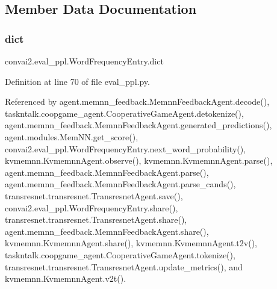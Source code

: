 \subsection{Member Data Documentation}
\mbox{\label{classconvai2_1_1eval__ppl_1_1WordFrequencyEntry_aaffbcedf94769977f77c38e9587b980c}} 
\subsubsection{\texorpdfstring{dict}{dict}}
{\footnotesize\ttfamily convai2.\+eval\+\_\+ppl.\+Word\+Frequency\+Entry.\+dict}



Definition at line 70 of file eval\+\_\+ppl.\+py.



Referenced by agent.\+memnn\+\_\+feedback.\+Memnn\+Feedback\+Agent.\+decode(), taskntalk.\+coopgame\+\_\+agent.\+Cooperative\+Game\+Agent.\+detokenize(), agent.\+memnn\+\_\+feedback.\+Memnn\+Feedback\+Agent.\+generated\+\_\+predictions(), agent.\+modules.\+Mem\+N\+N.\+get\+\_\+score(), convai2.\+eval\+\_\+ppl.\+Word\+Frequency\+Entry.\+next\+\_\+word\+\_\+probability(), kvmemnn.\+Kvmemnn\+Agent.\+observe(), kvmemnn.\+Kvmemnn\+Agent.\+parse(), agent.\+memnn\+\_\+feedback.\+Memnn\+Feedback\+Agent.\+parse(), agent.\+memnn\+\_\+feedback.\+Memnn\+Feedback\+Agent.\+parse\+\_\+cands(), transresnet.\+transresnet.\+Transresnet\+Agent.\+save(), convai2.\+eval\+\_\+ppl.\+Word\+Frequency\+Entry.\+share(), transresnet.\+transresnet.\+Transresnet\+Agent.\+share(), agent.\+memnn\+\_\+feedback.\+Memnn\+Feedback\+Agent.\+share(), kvmemnn.\+Kvmemnn\+Agent.\+share(), kvmemnn.\+Kvmemnn\+Agent.\+t2v(), taskntalk.\+coopgame\+\_\+agent.\+Cooperative\+Game\+Agent.\+tokenize(), transresnet.\+transresnet.\+Transresnet\+Agent.\+update\+\_\+metrics(), and kvmemnn.\+Kvmemnn\+Agent.\+v2t().

\mbox{\label{classconvai2_1_1eval__ppl_1_1WordFrequencyEntry_a6afe352975394701e253b6c7c9980774}} 
